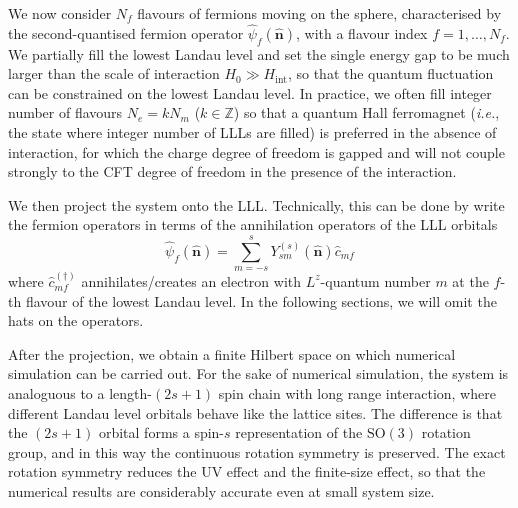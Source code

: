 \documentclass{timesjhep}
\begin{document}
We now consider $N_f$ flavours of fermions moving on the sphere, characterised by the second-quantised fermion operator $\hat{\psi}_f(\hat{\mathbf{n}})$, with a flavour index $f=1,\dots,N_f$. We partially fill the lowest Landau level and set the single energy gap to be much larger than the scale of interaction $H_0\gg H_\mathrm{int}$, so that the quantum fluctuation can be constrained on the lowest Landau level. In practice, we often fill integer number of flavours $N_e=kN_m$ ($k\in\mathbb{Z}$) so that a quantum Hall ferromagnet (\textit{i.e.}, the state where integer number of LLLs are filled) is preferred in the absence of interaction, for which the charge degree of freedom is gapped and will not couple strongly to the CFT degree of freedom in the presence of the interaction. 

We then project the system onto the LLL. Technically, this can be done by write the fermion operators in terms of the annihilation operators of the LLL orbitals
\begin{equation}
    \hat{\psi}_f(\hat{\mathbf{n}})=\sum_{m=-s}^s Y^{(s)}_{sm}(\hat{\mathbf{n}})\hat{c}_{mf}
\end{equation} 
where $\hat{c}^{(\dagger)}_{mf}$ annihilates/creates an electron with $L^z$-quantum number $m$ at the $f$-th flavour of the lowest Landau level. In the following sections, we will omit the hats on the operators. 

After the projection, we obtain a finite Hilbert space on which numerical simulation can be carried out. For the sake of numerical simulation, the system is analoguous to a length-$(2s+1)$ spin chain with long range interaction, where different Landau level orbitals behave like the lattice sites. The difference is that the $(2s+1)$ orbital forms a spin-$s$ representation of the $\mathrm{SO}(3)$ rotation group, and in this way the continuous rotation symmetry is preserved. The exact rotation symmetry reduces the UV effect and the finite-size effect, so that the numerical results are considerably accurate even at small system size. 
\end{document}
